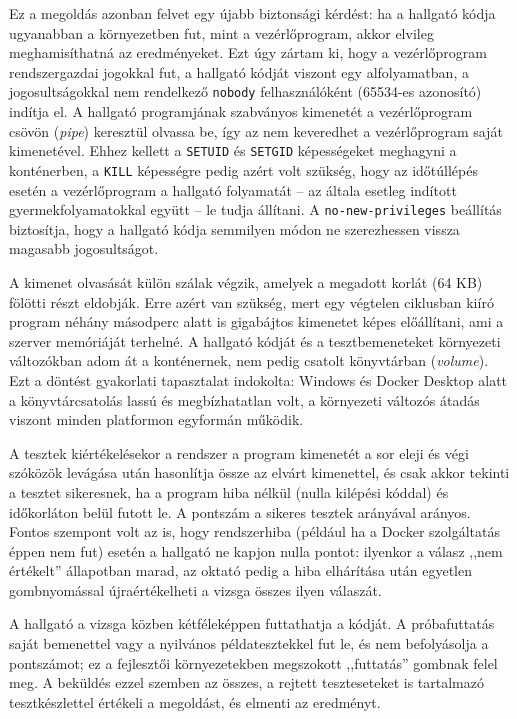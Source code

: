 Ez a megoldás azonban felvet egy újabb biztonsági kérdést: ha a hallgató kódja ugyanabban a
környezetben fut, mint a vezérlőprogram, akkor elvileg meghamisíthatná az eredményeket. Ezt úgy
zártam ki, hogy a vezérlőprogram rendszergazdai jogokkal fut, a hallgató kódját viszont egy
alfolyamatban, a jogosultságokkal nem rendelkező \texttt{nobody} felhasználóként (65534-es
azonosító) indítja el. A hallgató programjának szabványos kimenetét a vezérlőprogram csövön
(\textit{pipe}) keresztül olvassa be, így az nem keveredhet a vezérlőprogram saját kimenetével.
Ehhez kellett a \texttt{SETUID} és \texttt{SETGID} képességeket meghagyni a konténerben, a
\texttt{KILL} képességre pedig azért volt szükség, hogy az időtúllépés esetén a vezérlőprogram a
hallgató folyamatát -- az általa esetleg indított gyermekfolyamatokkal együtt -- le tudja állítani.
A \texttt{no-new-privileges} beállítás biztosítja, hogy a hallgató kódja semmilyen módon ne
szerezhessen vissza magasabb jogosultságot.

A kimenet olvasását külön szálak végzik, amelyek a megadott korlát (64 KB) fölötti részt eldobják.
Erre azért van szükség, mert egy végtelen ciklusban kiíró program néhány másodperc alatt is
gigabájtos kimenetet képes előállítani, ami a szerver memóriáját terhelné. A hallgató kódját és a
tesztbemeneteket környezeti változókban adom át a konténernek, nem pedig csatolt könyvtárban
(\textit{volume}). Ezt a döntést gyakorlati tapasztalat indokolta: Windows és Docker Desktop alatt
a könyvtárcsatolás lassú és megbízhatatlan volt, a környezeti változós átadás viszont minden
platformon egyformán működik.

A tesztek kiértékelésekor a rendszer a program kimenetét a sor eleji és végi szóközök levágása
után hasonlítja össze az elvárt kimenettel, és csak akkor tekinti a tesztet sikeresnek, ha a
program hiba nélkül (nulla kilépési kóddal) és időkorláton belül futott le. A pontszám a sikeres
tesztek arányával arányos. Fontos szempont volt az is, hogy rendszerhiba (például ha a Docker
szolgáltatás éppen nem fut) esetén a hallgató ne kapjon nulla pontot: ilyenkor a válasz
,,nem értékelt'' állapotban marad, az oktató pedig a hiba elhárítása után egyetlen gombnyomással
újraértékelheti a vizsga összes ilyen válaszát.

A hallgató a vizsga közben kétféleképpen futtathatja a kódját. A próbafuttatás saját bemenettel
vagy a nyilvános példatesztekkel fut le, és nem befolyásolja a pontszámot; ez a fejlesztői
környezetekben megszokott ,,futtatás'' gombnak felel meg. A beküldés ezzel szemben az összes, a
rejtett teszteseteket is tartalmazó tesztkészlettel értékeli a megoldást, és elmenti az eredményt.


